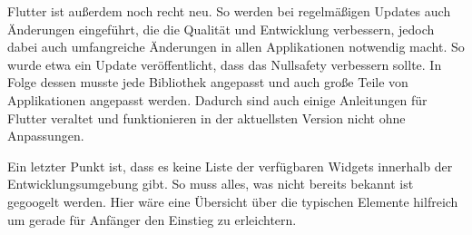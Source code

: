 Flutter ist außerdem noch recht neu. So werden bei regelmäßigen Updates auch Änderungen eingeführt, die die Qualität und Entwicklung verbessern, jedoch dabei auch umfangreiche Änderungen in allen Applikationen notwendig macht. So wurde etwa ein Update veröffentlicht, dass das Nullsafety verbessern sollte. In Folge dessen musste jede Bibliothek angepasst und auch große Teile von Applikationen angepasst werden. Dadurch sind auch einige Anleitungen für Flutter veraltet und funktionieren in der aktuellsten Version nicht ohne Anpassungen.

Ein letzter Punkt ist, dass es keine Liste der verfügbaren Widgets innerhalb der Entwicklungsumgebung gibt. So muss alles, was nicht bereits bekannt ist gegoogelt werden. Hier wäre eine Übersicht über die typischen Elemente hilfreich um gerade für Anfänger den Einstieg zu erleichtern.
